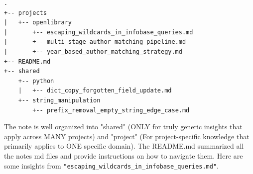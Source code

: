 \begin{tcolorbox}[colback=white,  %
                   colframe=black,    %
                   coltext=metablue,      %
                   breakable,
                   fontupper=\scriptsize\fontfamily{pcr}\selectfont]  %
\begin{verbatim}
.
+-- projects
|   +-- openlibrary
|       +-- escaping_wildcards_in_infobase_queries.md
|       +-- multi_stage_author_matching_pipeline.md
|       +-- year_based_author_matching_strategy.md
+-- README.md
+-- shared
    +-- python
    |   +-- dict_copy_forgotten_field_update.md
    +-- string_manipulation
        +-- prefix_removal_empty_string_edge_case.md
\end{verbatim}
\end{tcolorbox}

The note is well organized into "shared" (ONLY for truly generic insights that apply across MANY projects) and "project" (For project-specific knowledge that primarily applies to ONE specific domain). The README.md summarized all the notes md files and provide instructions on how to navigate them. Here are some insights from \texttt{"escaping\_wildcards\_in\_infobase\_queries.md"}.

